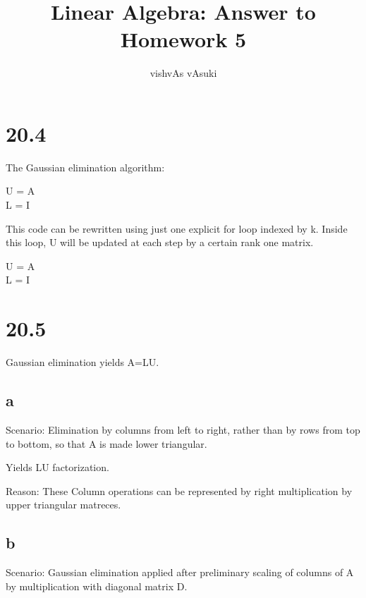 \documentclass[10pt]{amsart}
\title{Linear Algebra: Answer to Homework 5}
\author{vishvAs vAsuki}
\theoremstyle{remark}
\begin{document}
\maketitle

\section{20.4}
The Gaussian elimination algorithm:\\

\begin{algorithm}[H]
\SetLine
{}
U = A\\
L = I\\
\end{algorithm}

This code can be rewritten using just one explicit for loop indexed by k. Inside this loop, U will be updated at each step by a certain rank one matrix.

\begin{algorithm}[H]
\SetLine
{}
U = A\\
L = I\\
\end{algorithm}

\section{20.5}
Gaussian elimination yields A=LU.

\subsection{a}
Scenario: Elimination by columns from left to right, rather than by rows from top to bottom, so that A is made lower triangular.

Yields LU factorization.

Reason: These Column operations can be represented by right multiplication by upper triangular matreces.

\subsection{b}
Scenario: Gaussian elimination applied after preliminary scaling of columns of A by multiplication with diagonal matrix D.
\end{document}
